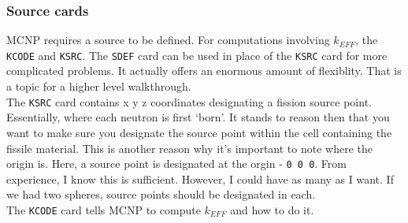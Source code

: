 \documentclass[11pt,a4paper]{article}
\begin{document}
\subsubsection{Source cards}
\noindent MCNP requires a source to be defined. For computations involving $k_{EFF}$, the \texttt{KCODE} and \texttt{KSRC}. The \texttt{SDEF} card can be used in place of the \texttt{KSRC} card for more complicated problems. It actually offers an enormous amount of flexiblity. That is a topic for a higher level walkthrough. \\

\noindent The \texttt{KSRC} card contains x y z coordinates designating a fission source point. Essentially, where each neutron is first `born'. It stands to reason then that you want to make sure you designate the source point within the cell containing the fissile material. This is another reason why it's important to note where the origin is. Here, a source point is designated at the orgin - \texttt{0 0 0}. From experience, I know this is sufficient. However, I could have as many as
I want. If we had two spheres, source points should be designated in each. \\

\noindent The \texttt{KCODE} card tells MCNP to compute $k_{EFF}$ and how to do it. 
\end{document}
